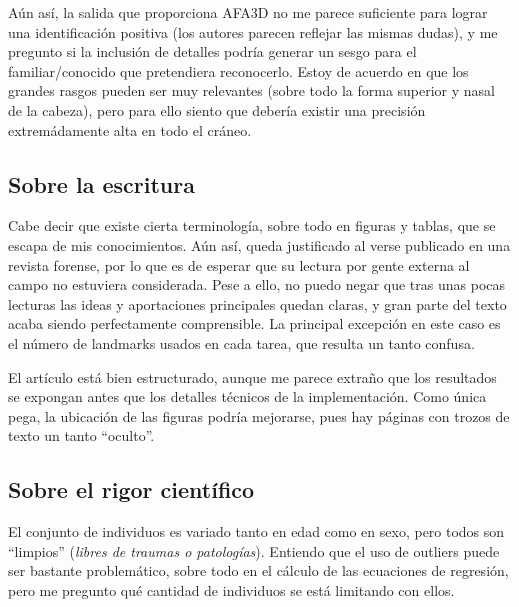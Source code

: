 \documentclass[13pt,a4paper]{article}
\begin{document}
\vspace{\baselineskip}

Aún así, la salida que proporciona AFA3D no me parece suficiente para lograr una identificación positiva (los autores parecen reflejar las mismas dudas), y me pregunto si la inclusión de detalles podría generar un sesgo para el familiar/conocido que pretendiera reconocerlo. Estoy de acuerdo en que los grandes rasgos pueden ser muy relevantes (sobre todo la forma superior y nasal de la cabeza), pero para ello siento que debería existir una precisión extremádamente alta en todo el cráneo.

\subsection{Sobre la escritura}

Cabe decir que existe cierta terminología, sobre todo en figuras y tablas, que se escapa de mis conocimientos. Aún así, queda justificado al verse publicado en una revista forense, por lo que es de esperar que su lectura por gente externa al campo no estuviera considerada. Pese a ello, no puedo negar que tras unas pocas lecturas las ideas y aportaciones principales quedan claras, y gran parte del texto acaba siendo perfectamente comprensible. La principal excepción en este caso es el número de landmarks usados en cada tarea, que resulta un tanto confusa.

\vspace{\baselineskip}

El artículo está bien estructurado, aunque me parece extraño que los resultados se expongan antes que los detalles técnicos de la implementación. Como única pega, la ubicación de las figuras podría mejorarse, pues hay páginas con trozos de texto un tanto ``oculto''.

\subsection{Sobre el rigor científico} %

El conjunto de individuos es variado tanto en edad como en sexo, pero todos son ``limpios'' (\textit{libres de traumas o patologías}). Entiendo que el uso de outliers puede ser bastante problemático, sobre todo en el cálculo de las ecuaciones de regresión, pero me pregunto qué cantidad de individuos se está limitando con ellos.

\vspace{\baselineskip}
\end{document}
